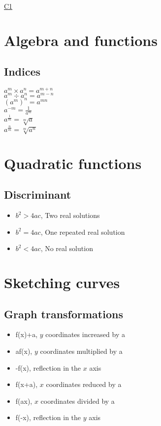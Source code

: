 \documentclass{article}[18pt]
\begin{document}
\begin{center}
\underline{\huge C1}
\end{center}
\section{Algebra and functions}
\subsection{Indices}
$a^m\times a^n=a^{m+n}$\\
$a^m\div a^n=a^{m-n}$\\
$(a^m)^n=a^{mn}$\\
$a^{-m}=\frac{1}{a^m}$\\
$a^{\frac{1}{m}}=\sqrt[m]{a}$\\
$a^{\frac{n}{m}}=\sqrt[m]{a^n}$\\
\section{Quadratic functions}
\subsection{Discriminant}
\begin{itemize}
\item $b^2>4ac$, Two real solutions
\item $b^2=4ac$, One repeated real solution
\item $b^2<4ac$, No real solution
\end{itemize}
\section{Sketching curves}
\subsection{Graph transformations}
\begin{itemize}
\item f(x)+a, $y$ coordinates increased by a
\item af(x), $y$ coordinates multiplied by a
\item -f(x), reflection in the $x$ axis
\item f(x+a), $x$ coordinates reduced by a
\item f(ax), $x$ coordinates divided by a
\item f(-x), reflection in the $y$ axis
\end{itemize}
\end{document}
